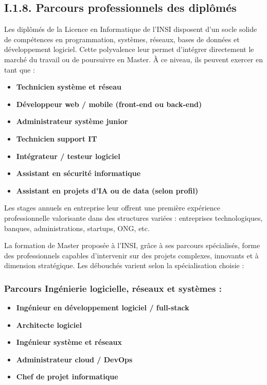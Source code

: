 \subsection{I.1.8. Parcours professionnels des diplômés}

Les diplômés de la Licence en Informatique de l'INSI disposent d'un socle solide de compétences en programmation, systèmes, réseaux, bases de données et développement logiciel. Cette polyvalence leur permet d'intégrer directement le marché du travail ou de poursuivre en Master. À ce niveau, ils peuvent exercer en tant que :

\begin{itemize}
    \item \textbf{Technicien système et réseau}
    \item \textbf{Développeur web / mobile (front-end ou back-end)}
    \item \textbf{Administrateur système junior}
    \item \textbf{Technicien support IT}
    \item \textbf{Intégrateur / testeur logiciel}
    \item \textbf{Assistant en sécurité informatique}
    \item \textbf{Assistant en projets d'IA ou de data (selon profil)}
\end{itemize}

Les stages annuels en entreprise leur offrent une première expérience professionnelle valorisante dans des structures variées : entreprises technologiques, banques, administrations, startups, ONG, etc.

La formation de Master proposée à l'INSI, grâce à ses parcours spécialisés, forme des professionnels capables d'intervenir sur des projets complexes, innovants et à dimension stratégique. Les débouchés varient selon la spécialisation choisie :

\subsubsection*{Parcours Ingénierie logicielle, réseaux et systèmes :}
\begin{itemize}
    \item \textbf{Ingénieur en développement logiciel / full-stack}
    \item \textbf{Architecte logiciel}
    \item \textbf{Ingénieur système et réseaux}
    \item \textbf{Administrateur cloud / DevOps}
    \item \textbf{Chef de projet informatique}
\end{itemize}

